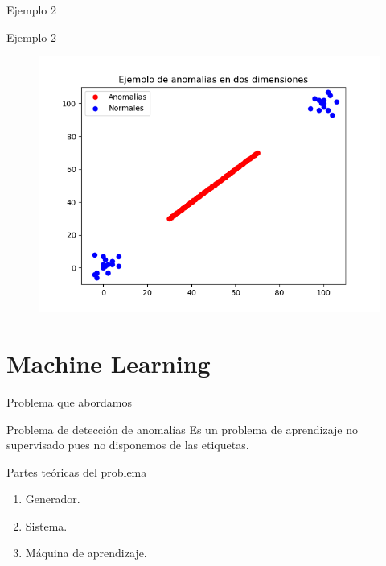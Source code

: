 \documentclass[10pt]{beamer}
\begin{document}
\begin{frame}[fragile]{Ejemplo 2}
\vspace{10px}
\centering
{}

\end{frame}

\begin{frame}[fragile]{Ejemplo 2}
\vspace{10px}

\begin{figure}
\centering
\includegraphics[scale=0.6]{Imagenes/outlier-2d-case2.png}
\end{figure}

\end{frame}

\section{Machine Learning}

\begin{frame}[fragile]{Problema que abordamos}
\vspace{10px}
\pause
{}

\begin{alertblock}{Problema de detección de anomalías}
	Es un problema de aprendizaje no supervisado pues no disponemos de las etiquetas.
\end{alertblock}

\pause

\begin{block}{Partes teóricas del problema}
	\begin{enumerate}
		\item Generador.
		\item Sistema.
		\item Máquina de aprendizaje.
	\end{enumerate}
\end{block}

\end{frame}
\end{document}
